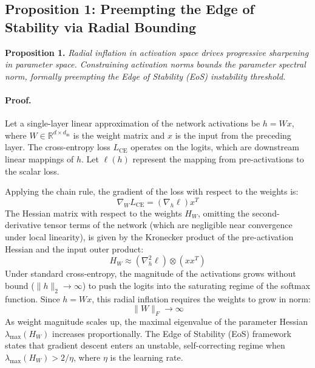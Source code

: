 \documentclass[11pt,a4paper]{article}
\begin{document}
\subsection{Proposition 1: Preempting the Edge of Stability via Radial Bounding}
\textbf{Proposition 1.} \textit{Radial inflation in activation space drives progressive sharpening in parameter space. Constraining activation norms bounds the parameter spectral norm, formally preempting the Edge of Stability (EoS) instability threshold.}

\paragraph{Proof.} Let a single-layer linear approximation of the network activations be $h = Wx$, where $W \in \mathbb{R}^{d \times d_{\text{in}}}$ is the weight matrix and $x$ is the input from the preceding layer. The cross-entropy loss $L_{\text{CE}}$ operates on the logits, which are downstream linear mappings of $h$. Let $\ell(h)$ represent the mapping from pre-activations to the scalar loss.

Applying the chain rule, the gradient of the loss with respect to the weights is:
\begin{equation}
\nabla_W L_{\text{CE}} = (\nabla_h \ell) x^T
\end{equation}
The Hessian matrix with respect to the weights $H_W$, omitting the second-derivative tensor terms of the network (which are negligible near convergence under local linearity), is given by the Kronecker product of the pre-activation Hessian and the input outer product:
\begin{equation}
H_W \approx (\nabla^2_h \ell) \otimes (x x^T)
\end{equation}
Under standard cross-entropy, the magnitude of the activations grows without bound ($\|h\|_2 \to \infty$) to push the logits into the saturating regime of the softmax function. Since $h = Wx$, this radial inflation requires the weights to grow in norm:
\begin{equation}
\|W\|_F \to \infty
\end{equation}
As weight magnitude scales up, the maximal eigenvalue of the parameter Hessian $\lambda_{\text{max}}(H_W)$ increases proportionally. The Edge of Stability (EoS) framework states that gradient descent enters an unstable, self-correcting regime when $\lambda_{\text{max}}(H_W) > 2/\eta$, where $\eta$ is the learning rate.
\end{document}
